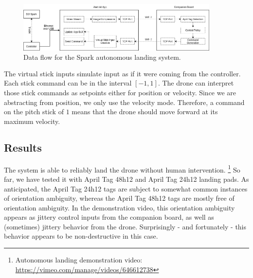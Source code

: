 \begin{figure}[ht]
    \centering
    \includegraphics[width=0.9\textwidth]{images/spark_architecture.drawio}
    \caption{Data flow for the Spark autonomous landing system.}
    \label{figure:spark_architecture}
\end{figure}

The virtual stick inputs simulate input as if it were coming from the controller.
Each stick command can be in the interval $[-1, 1]$.
The drone can interpret those stick commands as setpoints either for position or velocity.
Since we are abstracting from position, we only use the velocity mode.
Therefore, a command on the pitch stick of $1$
means that the drone should move forward at its maximum velocity.

\subsection{Results}

The system is able to reliably land the drone without human intervention.
\footnote{Autonomous landing demonstration video: \url{https://vimeo.com/manage/videos/646612738}}
So far, we have tested it with April Tag 48h12 and April Tag 24h12 landing pads.
As anticipated, the April Tag 24h12 tags are subject to somewhat common instances of orientation ambiguity,
whereas the April Tag 48h12 tags are mostly free of orientation ambiguity.
In the demonstration video, this orientation ambiguity appears as jittery control inputs from the companion board,
as well as (sometimes) jittery behavior from the drone.
Surprisingly - and fortunately - this behavior appears to be non-destructive in this case.

